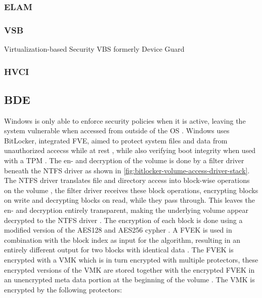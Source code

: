 \subsubsection{ELAM}
\cite{understanding-windows-trusted-boot}

\subsubsection{VSB}
Virtualization-based Security {VBS}
formerly Device Guard
\subsubsection{HVCI}




\subsection{\acf{BDE}}
\label{sec:windows:security:bde}
Windows is only able to enforce security policies when it is active, leaving the system vulnerable when accessed from outside of the \ac{OS} \cite[Section 9]{windows-internals-6-part2}.
Windows uses BitLocker, integrated \ac{FVE}, aimed to protect system files and data from unauthorized accecss while at rest \cite{microsoft-bitlocker-overview}, while also verifying boot integrity when used with a \ac{TPM} \cite[Section 9]{windows-internals-6-part2}.
The en- and decryption of the volume is done by a filter driver beneath the \ac{NTFS} driver as shown in \autoref{fig:bitlocker-volume-access-driver-stack}.
The \ac{NTFS} driver translates file and directory access into block-wise operations on the volume , the filter driver receives these block operations, encrypting blocks on write and decrypting blocks on read, while they pass through.
This leaves the en- and decryption entirely transparent, making the underlying volume appear decrypted to the \ac{NTFS} driver \cite[Section 9]{windows-internals-6-part2}.
The encryption of each block is done using a modified version of the \ac{AES}128 and \ac{AES}256 cypher \cite[Section 9]{windows-internals-6-part2}.
A \ac{FVEK} is used in combination with the block index as input for the algorithm, resulting in an entirely different output for two blocks with identical data \cite[Section 9]{windows-internals-6-part2}.
The \ac{FVEK} is encrypted with a \ac{VMK} which is in turn encrypted with multiple protectors, these encrypted versions of the \ac{VMK} are stored together with the encrypted \ac{FVEK} in an unencrypted meta data portion at the beginning of the volume \cite[Section 9]{windows-internals-6-part2}.
The \ac{VMK} is encrypted by the following protectors:

